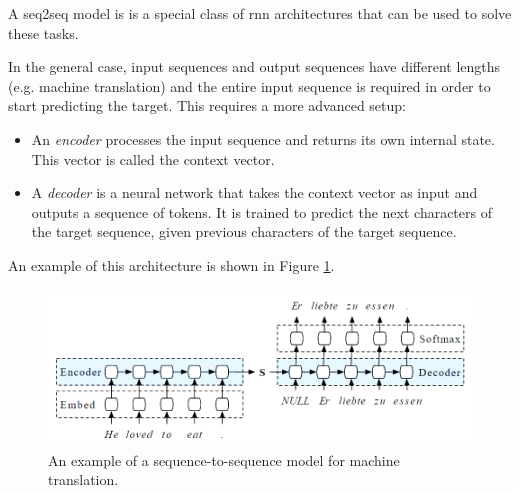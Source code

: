 A \acrfull{seq2seq} model is  is a special class of \acrfull{rnn} architectures  that can be used to solve these tasks.

In the general case, input sequences and output sequences have different lengths (e.g. machine translation) and the entire input sequence is required in order to start predicting the target. This requires a more advanced setup:
\begin{itemize}
    \item An \emph{encoder} processes the input sequence and returns its own internal state. This vector is called the context vector.
    \item A \emph{decoder} is a neural network that takes the context vector as input and outputs a sequence of tokens. It is trained to predict the next characters of the target sequence, given previous characters of the target sequence. 
\end{itemize}


An example of this architecture is shown in Figure \ref{fig:seq2seq}.
\begin{figure}[ht]
    \centering
    \includegraphics[width=0.8\linewidth]{images/2_1_seq2seq.png}
    \caption{An example of a sequence-to-sequence model for machine translation.}
    \label{fig:seq2seq}
\end{figure}



